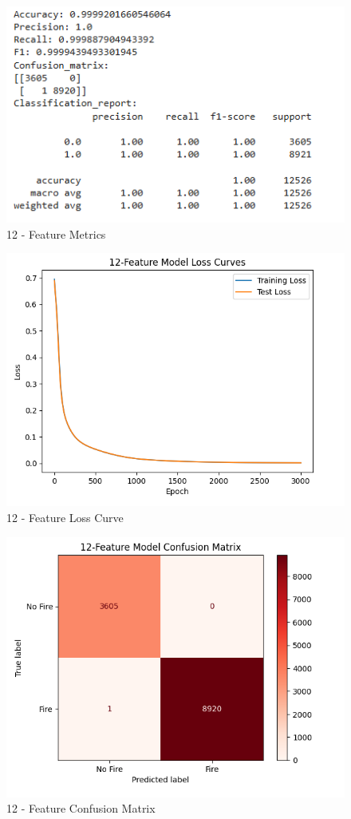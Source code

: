 \documentclass[conference]{IEEEtran}
\begin{document}
\begin{figure}
    \centering
    \includegraphics[width=0.75\linewidth]{images/12acc.png}
    \caption{12 - Feature Metrics}
    \label{fig: 1.0 }
\end{figure}

\begin{figure}
    \centering
    \includegraphics[width=0.75\linewidth]{images/12CM.png}
    \caption{12 - Feature Loss Curve}
    \label{fig: 1.2}
\end{figure}

\begin{figure}
    \centering
    \includegraphics[width=0.75\linewidth]{images/12CMM.png}
    \caption{12 - Feature Confusion Matrix}
    \label{fig:1.3}
\end{figure}
\end{document}
